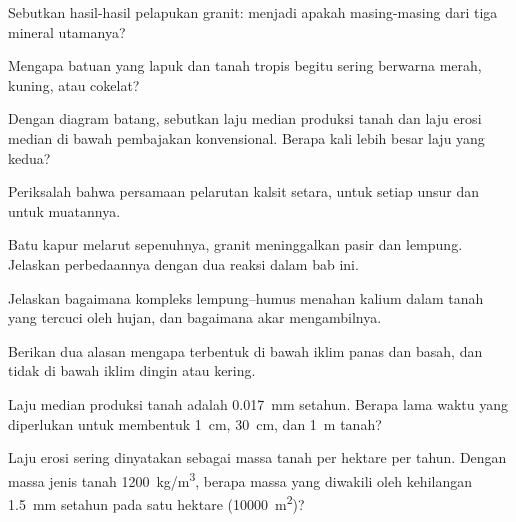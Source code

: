 \begin{exercise}[$\star$]\label{exo:g10:soil-formation:3}
Sebutkan hasil-hasil pelapukan granit: menjadi apakah masing-masing dari tiga
mineral utamanya?
\end{exercise}

\begin{exercise}[$\star$]\label{exo:g10:soil-formation:4}
Mengapa batuan yang lapuk dan tanah tropis begitu sering berwarna merah, kuning, atau cokelat?
\end{exercise}

\begin{exercise}[$\star$]\label{exo:g10:soil-formation:5}
Dengan diagram batang, sebutkan laju median produksi tanah dan laju erosi
median di bawah pembajakan konvensional. Berapa kali lebih besar laju yang
kedua?
\end{exercise}

\begin{exercise}[$\star\star$]\label{exo:g10:soil-formation:6}
Periksalah bahwa persamaan pelarutan kalsit setara, untuk setiap unsur dan
untuk muatannya.
\end{exercise}

\begin{exercise}[$\star\star$]\label{exo:g10:soil-formation:7}
Batu kapur melarut sepenuhnya, granit meninggalkan pasir dan lempung.
Jelaskan perbedaannya dengan dua reaksi dalam bab ini.
\end{exercise}

\begin{exercise}[$\star\star$]\label{exo:g10:soil-formation:8}
Jelaskan bagaimana kompleks lempung--humus menahan kalium dalam tanah yang
tercuci oleh hujan, dan bagaimana akar mengambilnya.
\end{exercise}

\begin{exercise}[$\star\star$]\label{exo:g10:soil-formation:9}
Berikan dua alasan mengapa  terbentuk di bawah iklim panas dan basah,
dan tidak di bawah iklim dingin atau kering.
\end{exercise}

\begin{exercise}[$\star\star$]\label{exo:g10:soil-formation:10}
Laju median produksi tanah adalah \qty{0.017}{mm} setahun. Berapa lama waktu
yang diperlukan untuk membentuk \qty{1}{cm}, \qty{30}{cm}, dan \qty{1}{m}
tanah?
\end{exercise}

\begin{exercise}[$\star\star$]\label{exo:g10:soil-formation:11}
Laju erosi sering dinyatakan sebagai massa tanah per hektare per tahun.
Dengan massa jenis tanah \qty{1200}{kg/m^3}, berapa massa yang diwakili oleh
kehilangan \qty{1.5}{mm} setahun pada satu hektare (\qty{10000}{m^2})?
\end{exercise}

